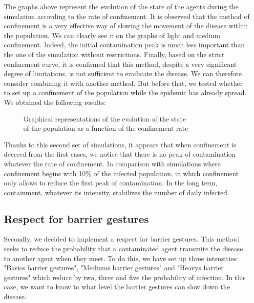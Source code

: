 \documentclass[a4paper, 12pt]{report}
\begin{document}
The graphs above represent the evolution of the state of the agents during the simulation according to the rate of confinement.
It is observed that the method of confinement is a very effective way of slowing the movement of the disease within the population. We can clearly see it
on the graphs of light and medium confinement. Indeed, the initial contamination peak is much less important than the one of the simulation without restrictions.
Finally, based on the strict confinement curve, it is confirmed that this method, despite a very significant degree of limitations, is not sufficient to eradicate the disease.
We can therefore consider combining it with another method. But before that, we tested whether to set up a confinement of the population while the epidemic has already spread.
We obtained the following results:

\begin{figure}[!h]
	\centering
	\qquad
\end{figure}
\begin{figure}[!h]
	\centering
	\qquad
	\caption{Graphical representations of the evolution of the state \\ of the population as a function of the confinement rate}

\end{figure}

\newpage

Thanks to this second set of simulations, it appears that when confinement is decreed from the first cases, we notice that there is no peak of contamination whatever the rate of confinement.
In comparison with simulations where confinement begins with 10\% of the infected population, in which confinement only allows
to reduce the first peak of contamination. In the long term, containment, whatever its intensity, stabilizes the number of daily infected.


\subsection{Respect for barrier gestures}

Secondly, we decided to implement a respect for barrier gestures. This method seeks to reduce the probability that a contaminated agent transmite the disease to another agent
when they meet. To do this, we have set up three intensities: "Basics barrier gestures", "Mediums barrier gestures" and "Heavys barrier gestures" which reduce by two, three and five
the probability of infection. In this case, we want to know to what level the barrier gestures can slow down the disease.
\end{document}
